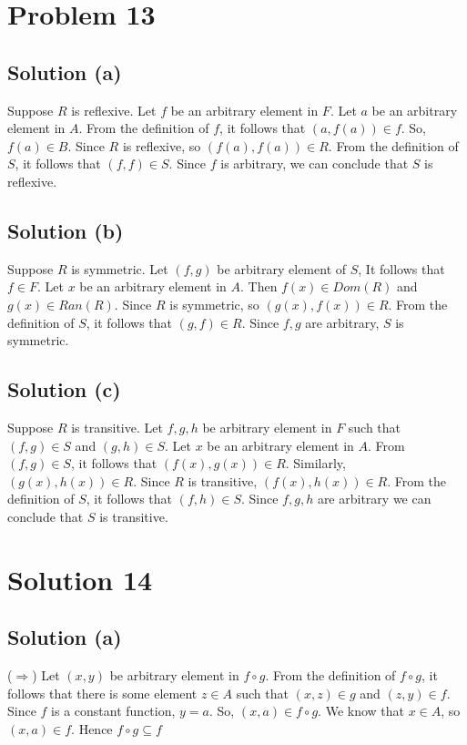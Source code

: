 \documentclass{article}
\begin{document}
\section{Problem 13}
\subsection{Solution (a)}
Suppose $R$ is reflexive. Let $f$ be an arbitrary element in $F$. Let
$a$ be an arbitrary element in $A$. From the definition of $f$, it
follows that $(a,f(a)) \in f$. So, $f(a) \in B$. Since $R$ is
reflexive, so $(f(a),f(a)) \in R$. From the definition of $S$, it
follows that $(f,f) \in S$. Since $f$ is arbitrary, we can conclude
that $S$ is reflexive.
  
\subsection{Solution (b)}
Suppose $R$ is symmetric. Let $(f,g)$ be arbitrary element of $S$, It
follows that $f \in F$. Let $x$ be an arbitrary element in $A$. Then
$f(x) \in Dom(R)$ and $g(x) \in Ran(R)$. Since $R$ is symmetric, so
$(g(x),f(x)) \in R$. From the definition of $S$, it follows that
$(g,f) \in R$. Since $f,g$ are arbitrary, $S$ is symmetric.

\subsection{Solution (c)}
Suppose $R$ is transitive. Let $f,g,h$ be arbitrary element in $F$
such that $(f,g) \in S$ and $(g,h) \in S$. Let $x$ be an arbitrary
element in $A$. From $(f,g) \in S$, it follows that
$(f(x),g(x)) \in R$. Similarly, $(g(x),h(x)) \in R$. Since $R$ is
transitive, $(f(x),h(x)) \in R$. From the definition of $S$, it
follows that $(f,h) \in S$. Since $f,g,h$ are arbitrary we can
conclude that $S$ is transitive.

\section{Solution 14}
\subsection{Solution (a)}
($\Rightarrow$) Let $(x,y)$ be arbitrary element in $f \circ g$. From
the definition of $f \circ g$, it follows that there is some element
$z \in A$ such that $(x,z) \in g$ and $(z,y) \in f$. Since $f$ is a
constant function, $y = a$. So, $(x,a) \in f \circ g$. We know that $x
\in A$, so $(x,a) \in f$. Hence $f \circ g \subseteq f$
\end{document}
